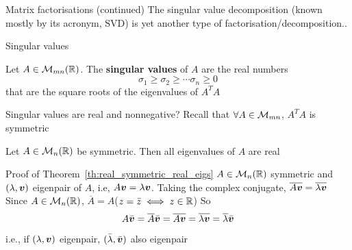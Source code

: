 \documentclass[aspectratio=169]{beamer}\usepackage[]{graphicx}\usepackage[]{xcolor}
\begin{document}


\begin{frame}{Matrix factorisations (continued)}
The singular value decomposition (known mostly by its acronym, SVD) is yet another type of factorisation/decomposition..
\end{frame}

\begin{frame}{Singular values}
\begin{importantdefinition}
Let $A\in\mathcal{M}_{mn}(\mathbb{R})$. The \textbf{singular values} of $A$ are the real numbers 
\[
\sigma_1\geq \sigma_2\geq\cdots\sigma_n\geq 0
\]
that are the square roots of the eigenvalues of $A^TA$
\end{importantdefinition}
\end{frame}


\begin{frame}{Singular values are real and nonnegative?}
Recall that $\forall A\in\mathcal{M}_{mn}$, $A^TA$ is symmetric
\vfill
\begin{importanttheorem}\label{th:real_symmetric_real_eigs}
Let $A\in\mathcal{M}_n(\mathbb{R})$ be symmetric. Then all eigenvalues of $A$ are real
\end{importanttheorem}
\end{frame}

\begin{frame}{Proof of Theorem~\ref{th:real_symmetric_real_eigs}}
$A\in\mathcal{M}_n(\mathbb{R})$ symmetric and $(\lambda,\bm{v})$ eigenpair of $A$, i.e, $A\bm{v}=\lambda\bm{v}$. Taking the complex conjugate, $\overline{A\bm{v}}=\overline{\lambda\bm{v}}$
\vfill
Since $A\in\mathcal{M}_n(\mathbb{R})$, $\overline{A}=A$\qquad ($z=\bar z\iff z\in\mathbb{R}$)
\vfill
So
\[
A\bar{\bm{v}}=\overline{A}\bar{\bm{v}}=\overline{A\bm{v}}=\overline{\lambda\bm{v}}=\overline{\lambda}\bar{\bm{v}}
\]
i.e., if $(\lambda,\bm{v})$ eigenpair, $(\bar\lambda,\bar{\bm{v}})$ also eigenpair
\end{frame}
\end{document}
